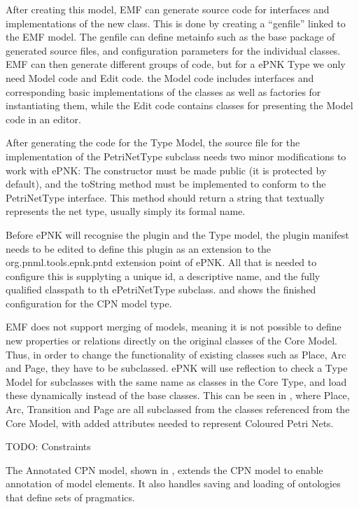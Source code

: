 After creating this model, EMF can generate source code for interfaces and
implementations of the new class. This is done by creating a ``genfile''
linked to the EMF model. The genfile can define metainfo such as the base
package of generated source files, and configuration parameters for the
individual classes. EMF can then generate different groups of code, but for a
ePNK Type we only need Model code and Edit code. the Model code includes
interfaces and corresponding basic implementations of the classes as well as
factories for instantiating them, while the Edit code contains classes for
presenting the Model code in an editor.

After generating the code for the Type Model, the source file for
the implementation of the PetriNetType subclass needs two minor modifications
to work with ePNK: The constructor must be made public (it is protected by
default), and the toString method must be implemented to conform to the
PetriNetType interface. This method should return a string that textually
represents the net type, usually simply its formal name.

Before ePNK will recognise the plugin and the Type model, the plugin manifest
needs to be edited to define this plugin as an extension to the
org.pnml.tools.epnk.pntd extension point of ePNK. All that is needed to
configure this is supplyting a unique id, a descriptive name, and the fully
qualified classpath to th ePetriNetType subclass.  and
 shows the finished configuration for the CPN model
type. 

EMF does not support merging of models, meaning it is not possible to define new
properties or relations directly on the original classes of the Core Model.
Thus, in order to change the functionality of existing classes such as Place,
Arc and Page, they have to be subclassed. ePNK will use reflection to check a
Type Model for subclasses with the same name as classes in the Core Type, and
load these dynamically instead of the base classes.
This can be seen in , where Place, Arc, Transition and Page are all
subclassed from the classes referenced from the Core Model, with added
attributes needed to represent Coloured Petri Nets.

TODO: Constraints

The Annotated CPN model, shown in , extends the CPN
model to enable annotation of model elements. It also handles saving and loading
of ontologies that define sets of pragmatics.

